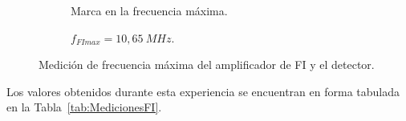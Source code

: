     \begin{figure}[H]
      \centering
      \begin{subfigure}[ht]{0.48\textwidth}
        \caption{Marca en la frecuencia máxima.}
        \label{fig:FrecuenciaMaxFI_Osc}
      \end{subfigure}
      \hfill 
      \begin{subfigure}[ht]{0.48\textwidth}
        \caption{$f_{FImax} = 10,65~MHz$.}
        \label{fig:FrecuneciaMaxFI_Gener}
      \end{subfigure}

      \caption{Medición de frecuencia máxima del amplificador de FI y el detector.}
      \label{fig:FrecuenciaMaxFI}
    \end{figure}

    Los valores obtenidos durante esta experiencia se encuentran en forma tabulada en la Tabla~\ref{tab:MedicionesFI}.


